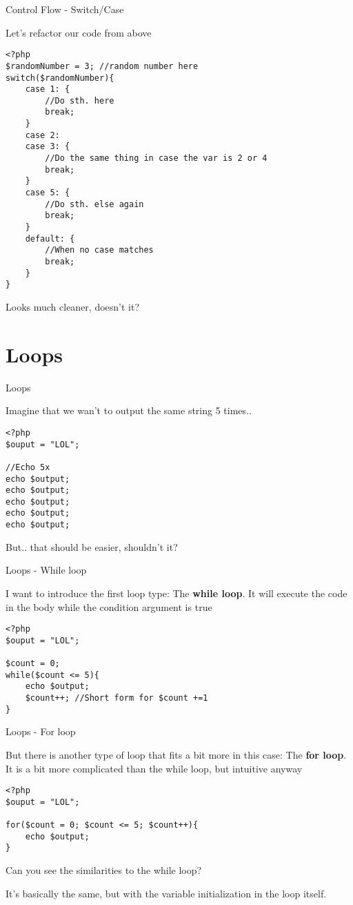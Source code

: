 \begin{frame}[fragile]{Control Flow - Switch/Case}

Let's refactor our code from above
\begin{lstlisting}
<?php
$randomNumber = 3; //random number here
switch($randomNumber){
	case 1: {
		//Do sth. here
		break;
	}
	case 2:
	case 3: {
		//Do the same thing in case the var is 2 or 4
		break;
	}
	case 5: {
		//Do sth. else again
		break;
	}
	default: {
		//When no case matches
		break;
	}
}
\end{lstlisting} 
\pause

Looks much cleaner, doesn't it?

\end{frame}

\section{Loops}

\begin{frame}[fragile]{Loops}

Imagine that we wan't to output the same string 5 times.. \pause

\begin{lstlisting}
<?php
$ouput = "LOL";

//Echo 5x
echo $output;
echo $output;
echo $output;
echo $output;
echo $output;
\end{lstlisting} 
\pause

But.. that should be easier, shouldn't it?

\end{frame}


\begin{frame}[fragile]{Loops - While loop}

I want to introduce the first loop type: The \textbf{while loop}.
It will execute the code in the body while the condition argument is true  \pause

\begin{lstlisting}
<?php
$ouput = "LOL";

$count = 0;
while($count <= 5){
	echo $output;
	$count++; //Short form for $count +=1
}
\end{lstlisting} 

\end{frame}

\begin{frame}[fragile]{Loops - For loop}

But there is another type of loop that fits a bit more in this case: The \textbf{for loop}.
It is a bit more complicated than the while loop, but intuitive anyway\pause

\begin{lstlisting}
<?php
$ouput = "LOL";

for($count = 0; $count <= 5; $count++){
	echo $output;
}
\end{lstlisting} \pause

Can you see the similarities to the while loop?

It's basically the same, but with the variable initialization in the loop itself.
\end{frame}

